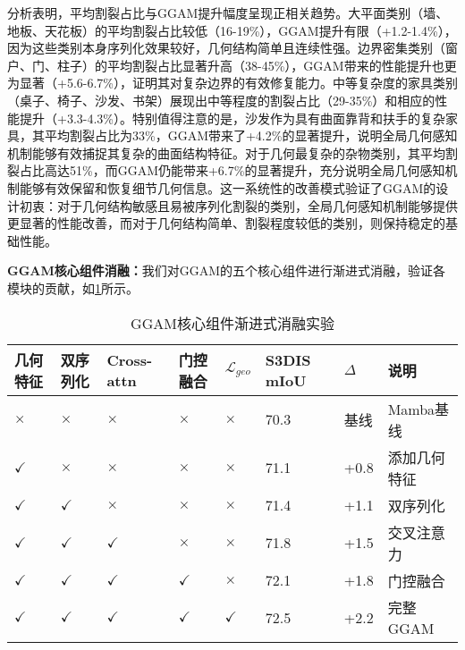 \documentclass[preprint,12pt]{elsarticle}
\begin{document}
分析表明，平均割裂占比与GGAM提升幅度呈现正相关趋势。大平面类别（墙、地板、天花板）的平均割裂占比较低（16-19\%），GGAM提升有限（+1.2-1.4\%），因为这些类别本身序列化效果较好，几何结构简单且连续性强。边界密集类别（窗户、门、柱子）的平均割裂占比显著升高（38-45\%），GGAM带来的性能提升也更为显著（+5.6-6.7\%），证明其对复杂边界的有效修复能力。中等复杂度的家具类别（桌子、椅子、沙发、书架）展现出中等程度的割裂占比（29-35\%）和相应的性能提升（+3.3-4.3\%）。特别值得注意的是，沙发作为具有曲面靠背和扶手的复杂家具，其平均割裂占比为33\%，GGAM带来了+4.2\%的显著提升，说明全局几何感知机制能够有效捕捉其复杂的曲面结构特征。对于几何最复杂的杂物类别，其平均割裂占比高达51\%，而GGAM仍能带来+6.7\%的显著提升，充分说明全局几何感知机制能够有效保留和恢复细节几何信息。这一系统性的改善模式验证了GGAM的设计初衷：对于几何结构敏感且易被序列化割裂的类别，全局几何感知机制能够提供更显著的性能改善，而对于几何结构简单、割裂程度较低的类别，则保持稳定的基础性能。


\textbf{GGAM核心组件消融：}我们对GGAM的五个核心组件进行渐进式消融，验证各模块的贡献，如\cref{tab:ggam_full_ablation}所示。

\begin{table}[htbp!]
	\centering
	\caption{GGAM核心组件渐进式消融实验}
	\label{tab:ggam_full_ablation}
	\begin{tabular}{@{}llllllll@{}}
		\toprule
		几何特征 & 双序列化 & Cross-attn & 门控融合 & $\mathcal{L}_{geo}$ & S3DIS mIoU & $\Delta$ & 说明 \\ 
		\midrule
		$\times$ & $\times$ & $\times$ & $\times$ & $\times$ & 70.3 & 基线 & Mamba基线 \\
		\midrule
		$\checkmark$ & $\times$ & $\times$ & $\times$ & $\times$ & 71.1 & +0.8 & 添加几何特征 \\
		$\checkmark$ & $\checkmark$ & $\times$ & $\times$ & $\times$ & 71.4 & +1.1 & 双序列化 \\
		$\checkmark$ & $\checkmark$ & $\checkmark$ & $\times$ & $\times$ & 71.8 & +1.5 & 交叉注意力 \\
		$\checkmark$ & $\checkmark$ & $\checkmark$ & $\checkmark$ & $\times$ & 72.1 & +1.8 & 门控融合 \\
		$\checkmark$ & $\checkmark$ & $\checkmark$ & $\checkmark$ & $\checkmark$ & 72.5 & +2.2 & 完整GGAM \\
		\bottomrule
	\end{tabular}
\end{table}
\end{document}
